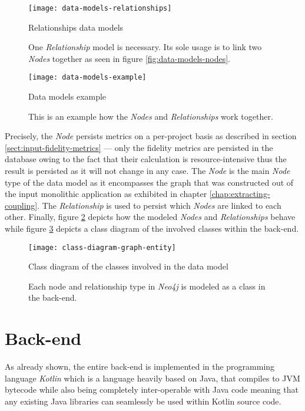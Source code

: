 \documentclass[12pt,a4paper]{report}
\begin{document}
\begin{figure}[htbp]
\centering
\texttt{[image: data-models-relationships]}
\caption{Relationships data models}
\caption*{\centering
  One \textit{Relationship} model is necessary. Its sole usage is to link
  two  \textit{Nodes} together as seen in figure \ref{fig:data-models-nodes}.
}
\label{fig:data-models-relationships}
\end{figure}

\begin{figure}[htbp]
\centering
\texttt{[image: data-models-example]}
\caption{Data models example}
\caption*{\centering
  This is an example how the \textit{Nodes} and \textit{Relationships} work together.
}
\label{fig:data-models-example}
\end{figure}

Precisely, the  \textit{Node} persists metrics on a per\hyp project basis
as described in section \ref{sect:input-fidelity-metrics} --- only the fidelity
metrics are persisted in the database owing to the fact that their calculation is
resource\hyp intensive thus the result is persisted as it will not change in any case.
The  \textit{Node} is the main \textit{Node} type of the data model as it
encompasses the graph that was constructed out of the input
monolithic application as exhibited in chapter \ref{chap:extracting-coupling}.
The  \textit{Relationship} is used to persist which
 \textit{Nodes} are linked to each other.
Finally, figure \ref{fig:data-models-example} depicts how the modeled
\textit{Nodes} and \textit{Relationships} behave while figure \ref{fig:class-diagram-graph-entity}
depicts a class diagram of the involved classes within the back-end.

\begin{figure}[htbp]
\centering
\texttt{[image: class-diagram-graph-entity]}
\caption{Class diagram of the classes involved in the data model}
\caption*{\centering
  Each node and relationship type in \textit{Neo4j} is modeled as a class
  in the back-end.
}
\label{fig:class-diagram-graph-entity}
\end{figure}



\section{Back-end} \label{sect:implementation-back-end}

As already shown, the entire back-end is implemented in the programming language
\textit{Kotlin} which is a language heavily based on Java, that compiles to JVM
bytecode while also being completely inter-operable with Java code meaning that
any existing Java libraries can seamlessly be used within Kotlin source code.
\end{document}
